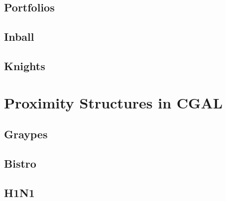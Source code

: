 \documentclass[10pt,a4paper,twoside]{report}
\begin{document}
\newpage
\subsection*{Portfolios}
\begin{keywords}\end{keywords}


\newpage
\subsection*{Inball}
\begin{keywords}\end{keywords}


\newpage
\subsection*{Knights}
\begin{keywords}\end{keywords}



\newpage
\section{Proximity Structures in CGAL}

\subsection*{Graypes}
\begin{keywords}\end{keywords}


\newpage
\subsection*{Bistro}
\begin{keywords}\end{keywords}


\newpage
\subsection*{H1N1}
\begin{keywords}\end{keywords}

\end{document}
